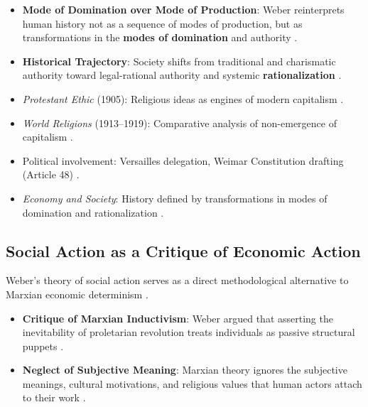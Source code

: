 \begin{KeyConcept}
\begin{itemize}
    \item \textbf{Mode of Domination over Mode of Production}: Weber reinterprets human history not as a sequence of modes of production, but as transformations in the \textbf{modes of domination} and authority .
    \item \textbf{Historical Trajectory}: Society shifts from traditional and charismatic authority toward legal-rational authority and systemic \textbf{rationalization} .
\end{itemize}
\end{KeyConcept}

\begin{QuickRevision}
\begin{itemize}
    \item \textit{Protestant Ethic} (1905): Religious ideas as engines of modern capitalism .
    \item \textit{World Religions} (1913--1919): Comparative analysis of non-emergence of capitalism .
    \item Political involvement: Versailles delegation, Weimar Constitution drafting (Article 48) .
    \item \textit{Economy and Society}: History defined by transformations in modes of domination and rationalization .
\end{itemize}
\end{QuickRevision}

\subsection{Social Action as a Critique of Economic Action}

Weber's theory of social action serves as a direct methodological alternative to Marxian economic determinism .

\begin{KeyConcept}
\begin{itemize}
    \item \textbf{Critique of Marxian Inductivism}: Weber argued that asserting the inevitability of proletarian revolution treats individuals as passive structural puppets .
    \item \textbf{Neglect of Subjective Meaning}: Marxian theory ignores the subjective meanings, cultural motivations, and religious values that human actors attach to their work .
\end{itemize}
\end{KeyConcept}

